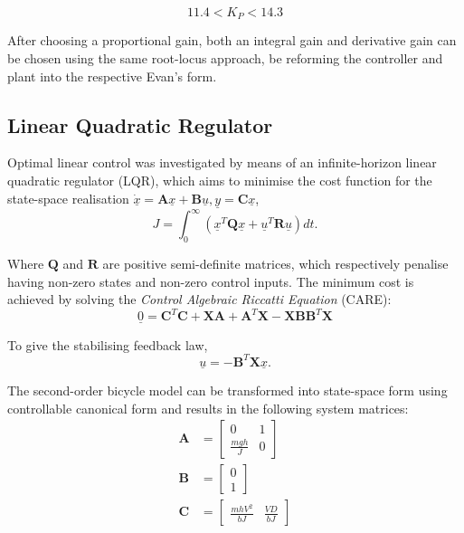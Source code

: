 \begin{equation}
11.4 < K_P < 14.3
\end{equation}

After choosing a proportional gain, both an integral gain and derivative gain can be chosen using the same root-locus approach, be reforming the controller and plant into the respective Evan's form.

\subsection{Linear Quadratic Regulator}
Optimal linear control was investigated by means of an infinite-horizon linear quadratic regulator (LQR), which aims to minimise the cost function for the state-space realisation $\underline{\dot{x}}=\mathbf{A} \underline{x} + \mathbf{B} \underline{u}, \underline{y} = \mathbf{C} \underline{x}$,
\begin{equation*}
J = \int_{0}^{\infty} (\underline{x}^T \mathbf{Q} \underline{x} + \underline{u}^T \mathbf{R} \underline{u}) dt.
\end{equation*}

Where $\mathbf{Q}$ and $\mathbf{R}$ are positive semi-definite matrices, which respectively penalise having non-zero states and non-zero control inputs. The minimum cost is achieved by solving the \textit{Control Algebraic Riccatti Equation} (CARE):
\begin{equation*}
\underline{0} = \mathbf{C}^T \mathbf{C} + \mathbf{X} \mathbf{A} + \mathbf{A}^T \mathbf{X} - \mathbf{X} \mathbf{B} \mathbf{B}^T \mathbf{X}
\end{equation*}

To give the stabilising feedback law,
\begin{equation*}
\underline{u} = -\mathbf{B}^T \mathbf{X} \underline{x}.
\end{equation*}

The second-order bicycle model can be transformed into state-space form using controllable canonical form and results in the following system matrices:
\begin{align*}
\mathbf{A} &= \begin{bmatrix}
0 & 1 \\
\frac{m g h}{J} & 0
\end{bmatrix} \\
\mathbf{B} &= \begin{bmatrix}
0 \\ 1
\end{bmatrix} \\
\mathbf{C} &= \begin{bmatrix}
\frac{m h V^2}{b J} & \frac{V D}{b J}
\end{bmatrix}
\end{align*}

